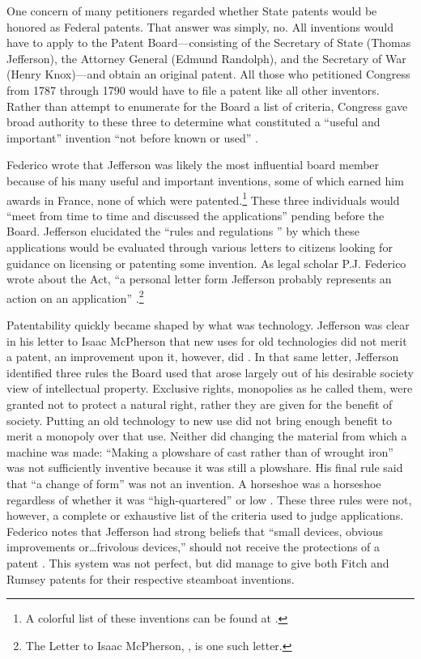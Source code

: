 \documentclass[12pt,letterpaper]{article}
\begin{document}
{One concern of many petitioners regarded whether State patents would be honored as Federal patents. That answer was simply, no. All inventions would have to apply to the Patent Board---consisting of the Secretary of State (Thomas Jefferson), the Attorney General (Edmund Randolph), and the Secretary of War (Henry Knox)---and obtain an original patent. All those who petitioned Congress from 1787 through 1790 would have to file a patent like all other inventors. Rather than attempt to enumerate for the Board a list of criteria, Congress gave broad authority to these three to determine what constituted a ``useful and important'' invention ``not before known or used'' \autocite[Citing the Patent Act of 1790, p. 238]{Federico1936}. 

Federico wrote that Jefferson was likely the most influential board member because of his many useful and important inventions, some of which earned him awards in France, none of which were patented.\footnote{A colorful list of these inventions can be found at \cite[239]{Federico1936}.} These three individuals would ``meet from time to time and discussed the applications'' pending before the Board. Jefferson elucidated the ``rules and regulations '' by which these applications would be evaluated through various letters to citizens looking for guidance on licensing or patenting some invention. As legal scholar P.J. Federico wrote about the Act, ``a personal letter form Jefferson probably represents an action on an application'' \autocite[239-243]{Federico1936}.\footnote{The Letter to Isaac McPherson, \cite{Jefferson1813}, is one such letter.}

Patentability quickly became shaped by what was technology. Jefferson was clear in his letter to Isaac McPherson that new uses for old technologies did not merit a patent, an improvement upon it, however, did \autocite{Jefferson1813}. In that same letter, Jefferson identified three rules the Board used that arose largely out of his desirable society view of intellectual property. Exclusive rights, monopolies as he called them, were granted not to protect a natural right, rather they are given for the benefit of society. Putting an old technology to new use did not bring enough benefit to merit a monopoly over that use. Neither did changing the material from which a machine was made: ``Making a plowshare of cast rather than of wrought iron'' was not sufficiently inventive because it was still a plowshare. His final rule said that ``a change of form'' was not an invention. A horseshoe was a horseshoe regardless of whether it was ``high-quartered'' or low \autocite{Jefferson1813, Federico1936}. These three rules were not, however, a complete or exhaustive list of the criteria used to judge applications. Federico notes that Jefferson had strong beliefs that ``small devices, obvious improvements or\ldots frivolous devices,'' should not receive the protections of a patent \autocite[241]{Federico1936}. This system was not perfect, but did manage to give both Fitch and Rumsey patents for their respective steamboat inventions.

}
\end{document}
